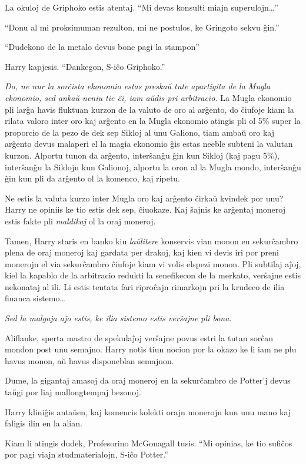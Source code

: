 La okuloj de Griphoko estis atentaj. ``Mi devas konsulti miajn
superulojn\ldots''

``Donu al mi proksimuman rezulton, mi ne postulos, ke Gringoto sekvu
ĝin.''

``Dudekono de la metalo devus bone pagi la stampon''

Harry kapjesis. ``Dankegon, S-iĉo Griphoko.''

\emph{Do, ne nur la sorĉista ekonomio estas preskaŭ tute apartigita de
  la Mugla ekonomio, sed ankaŭ neniu tie ĉi, iam aŭdis pri arbitracio.}
La Mugla ekonomio pli larĝa havis fluktuan kurzon de la valuto de oro
al arĝento, do ĉiufoje kiam la rilata valoro inter oro kaj arĝento en
la Mugla ekonomio atingis pli ol 5\% super la proporcio de la pezo de
dek sep Sikloj al unu Galiono, tiam ambaŭ oro kaj arĝento devus
malaperi el la magia ekonomio ĝis estas neeble subteni la valutan
kurzon. Alportu tunon da arĝento, interŝanĝu ĝin kun Sikloj (kaj pagu
5\%), interŝanĝu la Siklojn kun Galionoj, alportu la oron al la Mugla
mondo, interŝanĝu ĝin kun pli da arĝento ol la komenco, kaj ripetu.

Ne estis la valuta kurzo inter Mugla oro kaj arĝento ĉirkaŭ kvindek
por unu? Harry ne opiniis ke tio estis dek sep, ĉiuokaze. Kaj ŝajnis
ke arĝentaj moneroj estis fakte pli \emph{maldikaj} ol la oraj
moneroj.

Tamen, Harry staris en banko kiu \emph{laŭlitere} konservis vian monon
en sekurĉambro plena de oraj moneroj kaj gardata per drakoj, kaj kien
vi devis iri por preni monerojn el via sekurĉambro ĉiufoje kiam vi
volis elspezi monon. Pli subtilaj aĵoj, kiel la kapablo de la
arbitracio redukti la senefikecon de la merkato, verŝajne estis
nekonataj al ili. Li estis tentata fari riproĉajn rimarkojn pri la
krudeco de ilia financa sistemo\ldots

\emph{Sed la malgaja aĵo estis, ke ilia sistemo estis verŝajne pli
bona.}

Aliflanke, sperta mastro de spekulaĵoj verŝajne povus estri la tutan
sorĉan mondon post unu semajno. Harry notis tiun nocion por la okazo ke
li iam ne plu havus monon, aŭ havus disponeblan semajnon.

Dume, la gigantaj amasoj da oraj moneroj en la sekurĉambro de
Potter'j devus taŭgi por liaj mallongtempaj bezonoj.

Harry kliniĝis antaŭen, kaj komencis kolekti orajn monerojn kun
unu mano kaj faligis ilin en la alian.

Kiam li atingis dudek, Profesorino McGonagall tusis. ``Mi opinias, ke
tio sufiĉos por pagi viajn studmaterialojn, S-iĉo Potter.''

